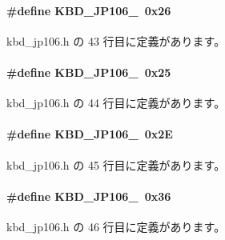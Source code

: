 \paragraph[{K\+B\+D\+\_\+\+J\+P106\+\_\+3}]{\setlength{\rightskip}{0pt plus 5cm}\#define K\+B\+D\+\_\+\+J\+P106\+\_~0x26}\label{kbd__jp106_8h_aca357c793a32b0f46a09332671bc6c78_aca357c793a32b0f46a09332671bc6c78}


 kbd\+\_\+jp106.\+h の 43 行目に定義があります。

\paragraph[{K\+B\+D\+\_\+\+J\+P106\+\_\+4}]{\setlength{\rightskip}{0pt plus 5cm}\#define K\+B\+D\+\_\+\+J\+P106\+\_~0x25}\label{kbd__jp106_8h_a2abc310c1522ad2329a1642d0c8e2c61_a2abc310c1522ad2329a1642d0c8e2c61}


 kbd\+\_\+jp106.\+h の 44 行目に定義があります。

\paragraph[{K\+B\+D\+\_\+\+J\+P106\+\_\+5}]{\setlength{\rightskip}{0pt plus 5cm}\#define K\+B\+D\+\_\+\+J\+P106\+\_~0x2\+E}\label{kbd__jp106_8h_aa8cd20b39be8d9e4a70d5808338a2f69_aa8cd20b39be8d9e4a70d5808338a2f69}


 kbd\+\_\+jp106.\+h の 45 行目に定義があります。

\paragraph[{K\+B\+D\+\_\+\+J\+P106\+\_\+6}]{\setlength{\rightskip}{0pt plus 5cm}\#define K\+B\+D\+\_\+\+J\+P106\+\_~0x36}\label{kbd__jp106_8h_ac423c56dadb1185501a764585f9d9aaa_ac423c56dadb1185501a764585f9d9aaa}


 kbd\+\_\+jp106.\+h の 46 行目に定義があります。

